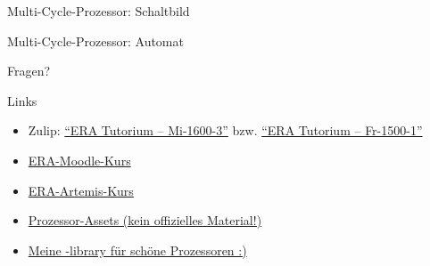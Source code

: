 \begin{frame}[c]{Multi-Cycle-Prozessor: Schaltbild}{}
	\begin{center}
		\resizebox{0.75\textwidth}{!}{
			
		}
	\end{center}
\end{frame}

\begin{frame}[c]{Multi-Cycle-Prozessor: Automat}{}
	\begin{center}
		\resizebox{0.6\textwidth}{!}{
			
		}
	\end{center}
\end{frame}

\begin{frame}[c, fragile]{}{}
	\begin{center}
		\LARGE Fragen?
	\end{center}
\end{frame}

\begin{frame}[c, fragile]{Links}{}
	\begin{itemize}
		\item Zulip: \href{https://zulip.in.tum.de/#narrow/channel/3255-ERA-Tutorium-.E2.80.93-Mi-1600-3}{\enquote{ERA Tutorium -- Mi-1600-3}}
		      bzw. \href{https://zulip.in.tum.de/#narrow/channel/3264-ERA-Tutorium-.E2.80.93-Fr-1500-1}{\enquote{ERA Tutorium -- Fr-1500-1}}
		\item \href{https://www.moodle.tum.de/course/view.php?id=111440}{ERA-Moodle-Kurs}
		\item \href{https://artemis.tum.de/courses/516}{ERA-Artemis-Kurs}
		\item \href{https://courses.edx.org/assets/courseware/v1/f06a2dc0c856f60ec0711e9f5e1c98cf/asset-v1:HarveyMuddX+ENGR85B+1T2023+type@asset+block/FinalReferences.pdf}{Prozessor-Assets (kein offizielles Material!)}
		\item \href{https://github.com/ladnik/riscv-circuitikz}{Meine \Circuitikz{}-library für schöne Prozessoren :)}
	\end{itemize}
\end{frame}

\maketitle


